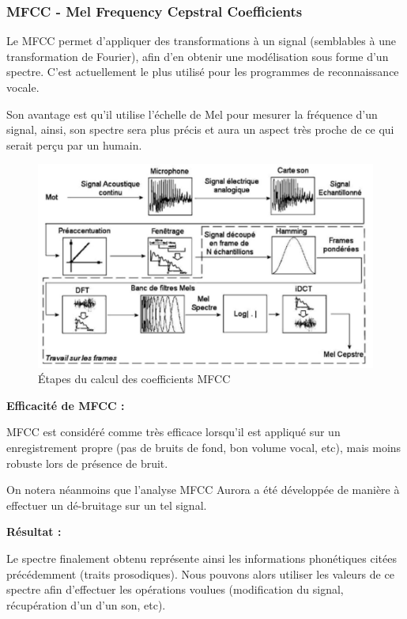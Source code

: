 \documentclass[a4paper, 12pt]{book}
\newcounter{program}[subsection]
\begin{document}
\subsubsection{MFCC - Mel Frequency Cepstral Coefficients}

Le MFCC permet d’appliquer des transformations à un signal (semblables à une transformation de Fourier), afin d’en obtenir une modélisation sous forme d’un spectre. C’est actuellement le plus utilisé pour les programmes de reconnaissance vocale.

Son avantage est qu’il utilise l’échelle de Mel pour mesurer la fréquence d’un signal, ainsi,
son spectre sera plus précis et aura un aspect très proche de ce qui serait perçu par un humain.

\begin{figure}[htbp]
  \centering
  \includegraphics[width=1\linewidth]{fig/mfcc.png}
  \caption{Étapes du calcul des coefficients MFCC}
\end{figure}


\textbf{Efficacité de MFCC :}

MFCC est considéré comme très efficace lorsqu’il est appliqué sur un enregistrement propre (pas de bruits de fond, bon volume vocal, etc), mais moins robuste lors de présence de bruit.

On notera néanmoins que l’analyse MFCC Aurora a été développée de manière à effectuer un dé-bruitage sur un tel signal.



\textbf{Résultat :}

Le spectre finalement obtenu représente ainsi les informations phonétiques citées précédemment (traits prosodiques). Nous pouvons alors utiliser les valeurs de ce spectre afin d’effectuer les opérations voulues (modification du signal, récupération d’un d’un son, etc).
\end{document}
